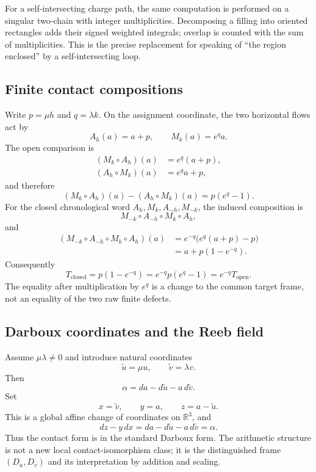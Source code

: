 For a self-intersecting charge path, the same computation is performed on a
singular two-chain with integer multiplicities.  Decomposing a filling into
oriented rectangles adds their signed weighted integrals; overlap is counted
with the sum of multiplicities.  This is the precise replacement for speaking
of ``the region enclosed'' by a self-intersecting loop.

\subsection{Finite contact compositions}

Write \(p=\mu h\) and \(q=\lambda k\).  On the assignment coordinate, the two
horizontal flows act by
\[
    A_h(a)=a+p,
    \qquad
    M_k(a)=e^q a.
\]
The open comparison is
\begin{align*}
    (M_k\circ A_h)(a)&=e^q(a+p),\\
    (A_h\circ M_k)(a)&=e^q a+p,
\end{align*}
and therefore
\[
    (M_k\circ A_h)(a)-(A_h\circ M_k)(a)
      =p(e^q-1).
\]
For the closed chronological word \(A_h,M_k,A_{-h},M_{-k}\), the induced
composition is
\[
    M_{-k}\circ A_{-h}\circ M_k\circ A_h,
\]
and
\begin{align*}
    (M_{-k}\circ A_{-h}\circ M_k\circ A_h)(a)
      &=e^{-q}\bigl(e^q(a+p)-p\bigr)\\
      &=a+p(1-e^{-q}).
\end{align*}
Consequently
\[
    T_{\mathrm{closed}}
      =p(1-e^{-q})
      =e^{-q}p(e^q-1)
      =e^{-q}T_{\mathrm{open}}.
\]
The equality after multiplication by \(e^q\) is a change to the common target
frame, not an equality of the two raw finite defects.

\subsection{Darboux coordinates and the Reeb field}

Assume \(\mu\lambda\ne0\) and introduce natural coordinates
\[
    \widetilde u=\mu u,
    \qquad
    \widetilde v=\lambda v.
\]
Then
\[
    \alpha=da-d\widetilde u-a\,d\widetilde v.
\]
Set
\[
    x=\widetilde v,
    \qquad y=a,
    \qquad z=a-\widetilde u.
\]
This is a global affine change of coordinates on \(\mathbb R^3\), and
\[
    dz-y\,dx
      =da-d\widetilde u-a\,d\widetilde v
      =\alpha.
\]
Thus the contact form is in the standard Darboux form.  The arithmetic
structure is not a new local contact-isomorphism class; it is the distinguished
frame \((D_u,D_v)\) and its interpretation by addition and scaling.

